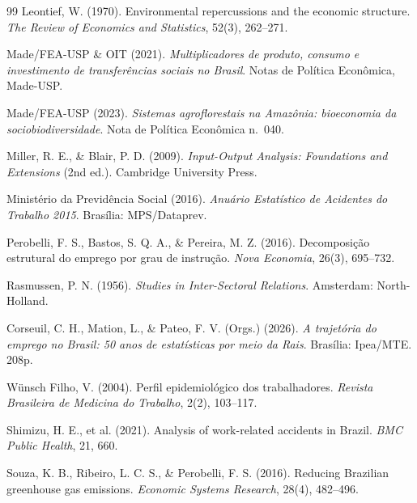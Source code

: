 \documentclass[12pt, a4paper]{article}
\begin{document}
\begin{thebibliography}{99}
Leontief, W. (1970).
Environmental repercussions and the economic structure.
\textit{The Review of Economics and Statistics}, 52(3), 262--271.

Made/FEA-USP \& OIT (2021).
\textit{Multiplicadores de produto, consumo e investimento de transferências sociais no Brasil}.
Notas de Política Econômica, Made-USP.

Made/FEA-USP (2023).
\textit{Sistemas agroflorestais na Amazônia: bioeconomia da sociobiodiversidade}.
Nota de Política Econômica n.~040.

Miller, R. E., \& Blair, P. D. (2009).
\textit{Input-Output Analysis: Foundations and Extensions} (2nd ed.).
Cambridge University Press.

Ministério da Previdência Social (2016).
\textit{Anuário Estatístico de Acidentes do Trabalho 2015}.
Brasília: MPS/Dataprev.

Perobelli, F. S., Bastos, S. Q. A., \& Pereira, M. Z. (2016).
Decomposição estrutural do emprego por grau de instrução.
\textit{Nova Economia}, 26(3), 695--732.

Rasmussen, P. N. (1956).
\textit{Studies in Inter-Sectoral Relations}.
Amsterdam: North-Holland.

Corseuil, C. H., Mation, L., \& Pateo, F. V. (Orgs.) (2026).
\textit{A trajetória do emprego no Brasil: 50 anos de estatísticas por meio da Rais}.
Brasília: Ipea/MTE. 208p.

Wünsch Filho, V. (2004).
Perfil epidemiológico dos trabalhadores.
\textit{Revista Brasileira de Medicina do Trabalho}, 2(2), 103--117.

Shimizu, H. E., et al. (2021).
Analysis of work-related accidents in Brazil.
\textit{BMC Public Health}, 21, 660.

Souza, K. B., Ribeiro, L. C. S., \& Perobelli, F. S. (2016).
Reducing Brazilian greenhouse gas emissions.
\textit{Economic Systems Research}, 28(4), 482--496.

\end{thebibliography}
\end{document}
